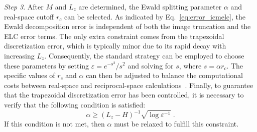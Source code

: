 \emph{Step 3}. After $M$ and $L_z$ are determined, the Ewald splitting parameter $\alpha$ and real-space cutoff $r_c$ can be selected. 
As indicated by Eq.~\eqref{eq:error_icmelc}, the Ewald decomposition error is independent of both the image truncation and the ELC error terms. 
The only extra constraint comes from the trapezoidal discretization error, which is typically minor due to its rapid decay with increasing $L_z$.
Consequently, the standard strategy can be employed to choose these parameters by setting $\varepsilon = e^{-s^2}/s^2$ and solving for $s$, where $s=\alpha r_c$. 
The specific values of $r_c$ and $\alpha$ can then be adjusted to balance the computational costs between real-space and reciprocal-space calculations~\cite{frenkel2023understanding}.
Finally, to guarantee that the trapezoidal discretization error has been controlled, it is necessary to verify that the following condition is satisfied: 
\begin{equation}
    \alpha \geq (L_z-H)^{-1}\sqrt{\log\varepsilon^{-1}}\;.
\end{equation}
If this condition is not met, then $\alpha$ must be relaxed to fulfill this constraint.

